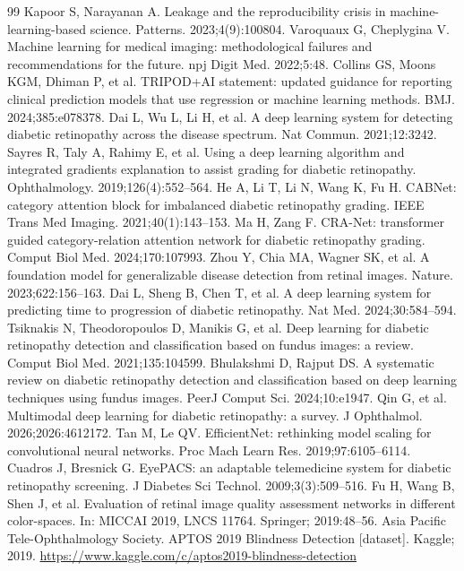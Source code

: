 \documentclass[11pt,a4paper]{article}
\begin{document}
\begin{thebibliography}{99}
 Kapoor S, Narayanan A. Leakage and the reproducibility crisis in machine-learning-based science. Patterns. 2023;4(9):100804.
 Varoquaux G, Cheplygina V. Machine learning for medical imaging: methodological failures and recommendations for the future. npj Digit Med. 2022;5:48.
 Collins GS, Moons KGM, Dhiman P, et al. TRIPOD+AI statement: updated guidance for reporting clinical prediction models that use regression or machine learning methods. BMJ. 2024;385:e078378.
 Dai L, Wu L, Li H, et al. A deep learning system for detecting diabetic retinopathy across the disease spectrum. Nat Commun. 2021;12:3242.
 Sayres R, Taly A, Rahimy E, et al. Using a deep learning algorithm and integrated gradients explanation to assist grading for diabetic retinopathy. Ophthalmology. 2019;126(4):552--564.
 He A, Li T, Li N, Wang K, Fu H. CABNet: category attention block for imbalanced diabetic retinopathy grading. IEEE Trans Med Imaging. 2021;40(1):143--153.
 Ma H, Zang F. CRA-Net: transformer guided category-relation attention network for diabetic retinopathy grading. Comput Biol Med. 2024;170:107993.
 Zhou Y, Chia MA, Wagner SK, et al. A foundation model for generalizable disease detection from retinal images. Nature. 2023;622:156--163.
 Dai L, Sheng B, Chen T, et al. A deep learning system for predicting time to progression of diabetic retinopathy. Nat Med. 2024;30:584--594.
 Tsiknakis N, Theodoropoulos D, Manikis G, et al. Deep learning for diabetic retinopathy detection and classification based on fundus images: a review. Comput Biol Med. 2021;135:104599.
 Bhulakshmi D, Rajput DS. A systematic review on diabetic retinopathy detection and classification based on deep learning techniques using fundus images. PeerJ Comput Sci. 2024;10:e1947.
 Qin G, et al. Multimodal deep learning for diabetic retinopathy: a survey. J Ophthalmol. 2026;2026:4612172.
 Tan M, Le QV. EfficientNet: rethinking model scaling for convolutional neural networks. Proc Mach Learn Res. 2019;97:6105--6114.
 Cuadros J, Bresnick G. EyePACS: an adaptable telemedicine system for diabetic retinopathy screening. J Diabetes Sci Technol. 2009;3(3):509--516.
 Fu H, Wang B, Shen J, et al. Evaluation of retinal image quality assessment networks in different color-spaces. In: MICCAI 2019, LNCS 11764. Springer; 2019:48--56.
 Asia Pacific Tele-Ophthalmology Society. APTOS 2019 Blindness Detection [dataset]. Kaggle; 2019. \url{https://www.kaggle.com/c/aptos2019-blindness-detection}

\end{thebibliography}
\end{document}
